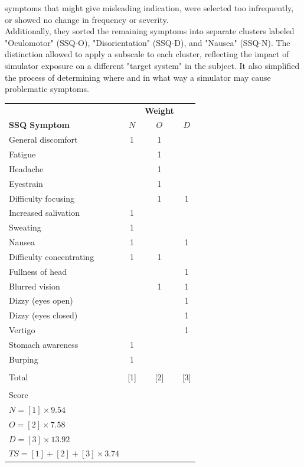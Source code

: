 symptoms that might give misleading indication, were selected too infrequently, or showed no change in frequency or
severity.
\\
Additionally, they sorted the remaining symptoms into separate clusters labeled "Oculomotor" (SSQ-O),
"Disorientation" (SSQ-D), and "Nausea" (SSQ-N).
The distinction allowed to apply a subscale to each cluster, reflecting the impact of simulator exposure on a
different "target system" in the subject.
It also simplified the process of determining where and in what way a simulator may cause problematic
symptoms.
\begin{center}
    \begin{tabular}{ l c c c}
        \toprule
        \textbf{ } & \textbf{ } & \textbf{Weight} & \textbf{ } \\
        \textbf{SSQ Symptom} & \textbf{$N$} & \textbf{$O$} & \textbf{$D$} \\
        \midrule
        General discomfort          & 1 & 1 &   \\
        Fatigue                     &   & 1 &   \\
        Headache                    &   & 1 &   \\
        Eyestrain                   &   & 1 &   \\
        Difficulty focusing         &   & 1 & 1 \\
        Increased salivation        & 1 &   &   \\
        Sweating                    & 1 &   &   \\
        Nausea                      & 1 &   & 1 \\
        Difficulty concentrating    & 1 & 1 &   \\
        Fullness of head            &   &   & 1 \\
        Blurred vision              &   & 1 & 1 \\
        Dizzy (eyes open)           &   &   & 1 \\
        Dizzy (eyes closed)         &   &   & 1 \\
        Vertigo                     &   &   & 1 \\
        Stomach awareness           & 1 &   &   \\
        Burping                     & 1 &   &   \\
        \\
        Total                       & [1] & [2] & [3] \\
        \\
        Score & & & \\
        $N = [1] \times 9.54$ & & & \\
        $O = [2] \times 7.58$ & & & \\
        $D = [3] \times 13.92$ & & & \\
        $TS = [1] + [2] + [3] \times 3.74$ & & & \\
        \bottomrule
    \end{tabular}
    \label{tab:ssq-scoring}
\end{center}
